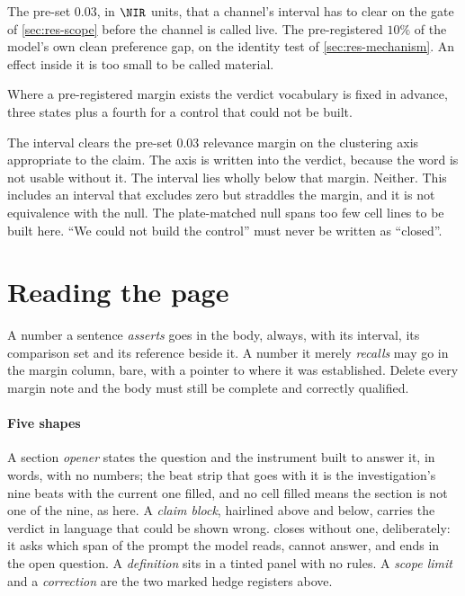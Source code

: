 \begin{description}[leftmargin=1em, itemsep=0.5ex,
                    font=\normalfont\bfseries]
 The pre-set $0.03$, in $\NIR$ units, that
  a channel's interval has to clear on the gate of \cref{sec:res-scope} before
  the channel is called live.
 The pre-registered $10\%$ of the model's
  own clean preference gap, on the identity test of \cref{sec:res-mechanism}. An
  effect inside it is too small to be called material.
\end{description}

Where a pre-registered margin exists the verdict vocabulary is fixed in advance,
three states plus a fourth for a control that could not be built.

\begin{description}[leftmargin=1em, itemsep=0.5ex,
                    font=\normalfont\bfseries]
 The interval clears the pre-set $0.03$ relevance margin on
  the clustering axis appropriate to the claim. The axis is written into the
  verdict, because the word is not usable without it.
 The interval lies wholly below that margin.
 Neither. This includes an interval that
  excludes zero but straddles the margin, and it is not equivalence with the
  null.
 The plate-matched null spans too few cell lines
  to be built here. ``We could not build the control'' must never be written as
  ``closed''.
\end{description}

\section*{Reading the page}

\noindent
A number a sentence \emph{asserts} goes in the body, always, with its interval,
its comparison set and its reference beside it. A number it merely
\emph{recalls} may go in the margin column, bare, with a pointer to where it was
established. Delete every margin note and the body must
still be complete and correctly qualified.

\paragraph{Five shapes} A section \emph{opener} states the question and the
instrument built to answer it, in words, with no numbers; the beat strip that
goes with it is the investigation's nine beats with the current one filled, and
no cell filled means the section is not one of the nine, as here. A \emph{claim
block}, hairlined above and below, carries the verdict in language that could be
shown wrong.  closes without one, deliberately: it asks which span
of the prompt the model reads, cannot answer, and ends in the open question. A
\emph{definition} sits in a tinted panel with no rules. A \emph{scope limit} and
a \emph{correction} are the two marked hedge registers above.


